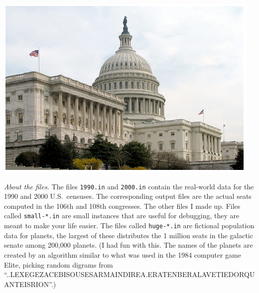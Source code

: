 \documentclass[9pt]{memoir}
\begin{document}
\begin{multicols}{2}

\noindent
\includegraphics[width=\columnwidth]{congressphoto.pdf}



\end{multicols}

\noindent
\emph{About the files.}
The files \texttt{1990.in} and \texttt{2000.in} contain the real-world data
for the 1990 and 2000 U.S.\ censuses.
The corresponding output files are the actual seats computed in the
106th and 108th congresses.
The other files I made up.
Files called \texttt{small-*.in} are small instances that are useful for
debugging, they are meant to make your life easier.
The files called \texttt{huge-*.in} are fictional population data for
planets, the largest of these distributes the 1 million seats in the
galactic senate among 200,000 planets.
(I had fun with this.
The names of the planets are created by an algorithm similar to what
was used in the 1984 computer game Elite, picking random digrams from
``..LEXEGEZACEBISOUSESARMAINDIREA.ERATENBERALAVETIEDORQUANTEISRION''.)
\end{document}
